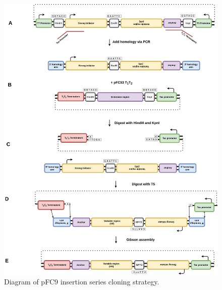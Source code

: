 \documentclass[11pt]{article}
\begin{document}
\begin{figure}[H]
	\includegraphics[width=15cm]{images/cloning_diagrams/construct_diagrams-Tac-termination-series.png}
	\centering
	\caption{Diagram of pFC9 insertion series cloning strategy.}
\end{figure}


\pagebreak


\end{document}
